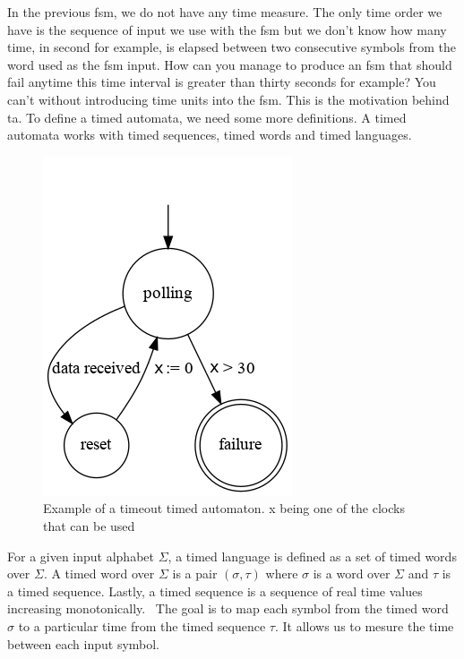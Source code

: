 \documentclass[12pt]{article}
\theoremstyle{definition}
\theoremstyle{definition}
\theoremstyle{remark}
\begin{document}

In the previous \gls{fsm}, we do not have any time measure. The only time order we have is the sequence of input we use with the \gls{fsm} but we don't know how many time, in second for example, is elapsed between two consecutive symbols from the word used as the \gls{fsm} input. How can you manage to produce an \gls{fsm} that should fail anytime this time interval is greater than thirty seconds for example? You can't without introducing time units into the \gls{fsm}. This is the motivation behind \gls{ta}. To define a timed automata, we need some more definitions. A timed automata works with timed sequences, timed words and timed languages.\\

\begin{figure}[H]
    \centering
    \includegraphics[scale=2.5]{timed_automata.png}
    \caption{Example of a timeout timed automaton. x being one of the clocks that can be used}
    \label{timed_automata_e1}
\end{figure}

For a given input alphabet $\Sigma$, a timed language is defined as a set of timed words over $\Sigma$. A timed word over $\Sigma$ is a pair $(\sigma, \tau)$ where $\sigma$ is a word over $\Sigma$ and $\tau$ is a timed sequence. Lastly, a timed sequence is a sequence of real time values increasing monotonically.~\cite{ALUR1994183} The goal is to map each symbol from the timed word $\sigma$ to a particular time from the timed sequence $\tau$. It allows us to mesure the time between each input symbol.
\end{document}
